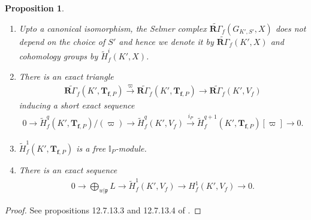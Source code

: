 \documentclass[reqno,10pt]{amsart}
\newcommand{\I}{\mathbb{I}}
\newcommand{\f}{\mathbf{f}}
\newcommand{\T}{\mathbf{T}}
\newcommand{\p}{\mathfrak{p}}
\newcommand{\ip}{\I_P}
\theoremstyle{plain}
\newtheorem{prop}[thm]{Proposition}
\theoremstyle{definition}
\begin{document}
\begin{prop} \label{SesForSelmerComplex}
    \begin{enumerate}
        \item Upto a canonical isomorphism, the Selmer complex $\widetilde{\textbf{R}\Gamma}_f(G_{K',S'},X)$ does not depend on the choice of $S'$ and hence we denote it by $\widetilde{\textbf{R}\Gamma}_f(K',X)$ and cohomology groups by $\widetilde{H}^i_f(K',X)$.

        \item There is an exact triangle
        \begin{align*}
             \widetilde{\textbf{R}\Gamma_f}(K',\T_{\f,P}) \xrightarrow{\varpi} \widetilde{\textbf{R}\Gamma_f}(K',\T_{\f,P}) \rightarrow\widetilde{\textbf{R}\Gamma_f}(K',V_f)
        \end{align*}
        inducing a short exact sequence
        \begin{align*}
            0 \rightarrow \widetilde{H}^q_f(K',\T_{\f,P})/(\varpi) \rightarrow \widetilde{H}^q_f(K',V_f) \xrightarrow{i_P} \widetilde{H}^{q+1}_f(K',\T_{\f,P})[\varpi] \rightarrow 0.
        \end{align*}

        \item  $\widetilde{H}^1_f(K',\T_{\f,P})$ is a free $\ip$-module.

        \item There is an exact sequence 
        \begin{align}
            0 \rightarrow \bigoplus_{w|\p} L \rightarrow \widetilde{H}^1_f(K',V_f) \rightarrow H^1_f(K',V_f) \rightarrow 0.
        \end{align}
    \end{enumerate}
\end{prop}

\begin{proof}
    See propositions 12.7.13.3 and 12.7.13.4 of \cite{Nekovar}.
\end{proof}
\end{document}
